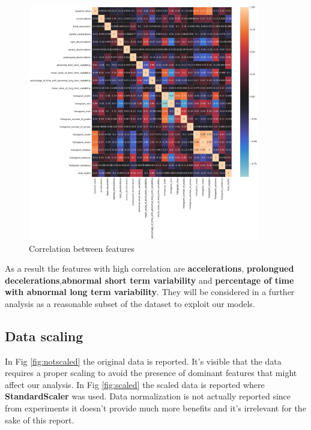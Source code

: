 \documentclass[a4paper,12pt]{article}
\begin{document}
\begin{figure}[H]
  \begin{center}
  \includegraphics[width=0.9\textwidth]{images/correlation.png}
  \end{center}
  \caption{Correlation between features}
  \label{fig:correlation}
\end{figure}

\noindent As a result the features with high correlation are \textbf{accelerations}, \textbf{prolongued decelerations},\textbf{abnormal short term variability} and \textbf{percentage of time with abnormal long term variability}. They will be considered in a further analysis as a reasonable subset of the dataset to exploit our models.

\subsection{Data scaling}
In Fig \ref{fig:notscaled} the original data is reported. It's visible that the data requires a proper scaling to avoid the presence of dominant features that might affect our analysis. In Fig \ref{fig:scaled} the scaled data is reported where \textbf{StandardScaler} was used. Data normalization is not actually reported since from experiments it doesn't provide much more benefits and it's irrelevant for the sake of this report.
\end{document}
